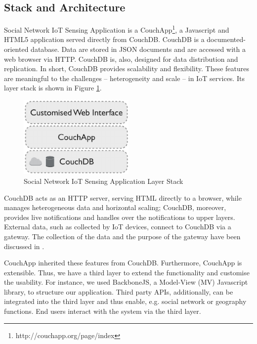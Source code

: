\subsection{Stack and Architecture}
Social Network IoT Sensing Application is a CouchApp\footnote{http://couchapp.org/page/index}, a Javascript and HTML5 application served directly from CouchDB. CouchDB is a documented-oriented database. Data are stored in JSON documents and are accessed with a web browser via HTTP. CouchDB is, also, designed for data distribution and replication. In short, CouchDB provides scalability and flexibility. These features are meaningful to the challenges \cite{francesco2012storage} -- heterogeneity and scale -- in IoT services. Its layer stack is shown in Figure \ref{fig:data-centre-app-stack}.

\begin{figure}[t]
  \begin{center}
    \includegraphics[width=0.5\textwidth]{images/data-centre-app-stack.pdf}
    \caption{Social Network IoT Sensing Application Layer Stack}
    \label{fig:data-centre-app-stack}
  \end{center}
\end{figure}

CouchDB acts as an HTTP server, serving HTML directly to a browser, while manages heterogeneous data and horizontal scaling; CouchDB, moreover, provides live notifications and handles over the notifications to upper layers. External data, such as collected by IoT devices, connect to CouchDB via a gateway. The collection of the data and the purpose of the gateway have been discussed in \cite{francesco2012storage}. 

CouchApp inherited these features from CouchDB. Furthermore, CouchApp is extensible. Thus, we have a third layer to extend the functionality and customise the usability. For instance, we used BackboneJS, a Model-View (MV) Javascript library, to structure our application. Third party APIs, additionally, can be integrated into the third layer and thus enable, e.g. social network or geography functions. End users interact with the system via the third layer. 

